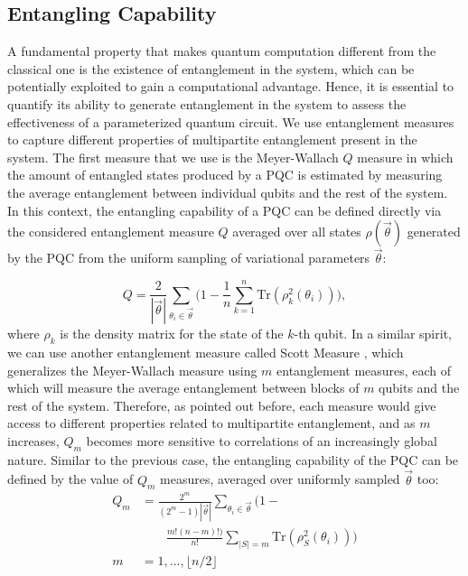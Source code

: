 \documentclass[%
 reprint,
 amsmath,
 amssymb,
 showkeys,
 pra,
 floatfix,
]{revtex4-2}
\begin{document}
\subsection{Entangling Capability}

A fundamental property that makes quantum computation different from the classical one is the existence of entanglement in the system, which can be potentially exploited to gain a computational advantage. Hence, it is essential to quantify its ability to generate entanglement in the system to assess the effectiveness of a parameterized quantum circuit. We use entanglement measures to capture different properties of multipartite entanglement present in the system. The first measure that we use is the Meyer-Wallach $Q$ measure \cite{10.1002/qute.201900070, doi:10.1063/1.1497700} in which the amount of entangled states produced by a PQC is estimated by measuring the average entanglement between individual qubits and the rest of the system. In this context, the entangling capability of a PQC can be defined directly via the considered entanglement measure $Q$ averaged over all states $\rho(
\vec{\theta})$ generated by the PQC from the uniform sampling of variational parameters $\vec{\theta}$:

\begin{equation}
	Q = \frac{2}{|\vec{\theta}|}\sum_{\theta_{i}\in \vec{\theta}}\Bigg(1-\frac{1}{n}\sum_{k=1}^{n}\text{Tr}(\rho_{k}^{2}(\theta_{i}))\Bigg),
\end{equation}
where $\rho_k$ is the density matrix for the state of the $k$-th qubit. In a similar spirit, we can use another entanglement measure called Scott Measure \cite{10.1007/s11128-007-0052-7}, which generalizes the Meyer-Wallach measure using $m$ entanglement measures, each of which will measure the average entanglement between blocks of $m$ qubits and the rest of the system. Therefore, as pointed out before, each measure would give access to different properties related to multipartite entanglement, and as $m$ increases, $Q_m$ becomes more sensitive to correlations of an increasingly global nature. Similar to the previous case, the entangling capability of the PQC can be defined by the value of $Q_m$ measures, averaged over uniformly sampled $\vec{\theta}$ too:
\begin{equation}
    \begin{split}
        Q_{m} &= \frac{2^{m}}{(2^{m}-1) |\vec{\theta}|}\sum_{\theta_i \in \vec{\theta}} \bigg(1 - \\ 
        & \quad \quad \frac{m! (n-m)!)}{n!}\sum_{|S|=m} \text{Tr} (\rho_{S}^2 (\theta_i)) \bigg) \\
        m &= 1, \ldots, \lfloor n/2 \rfloor
    \end{split}
\end{equation}
\end{document}
